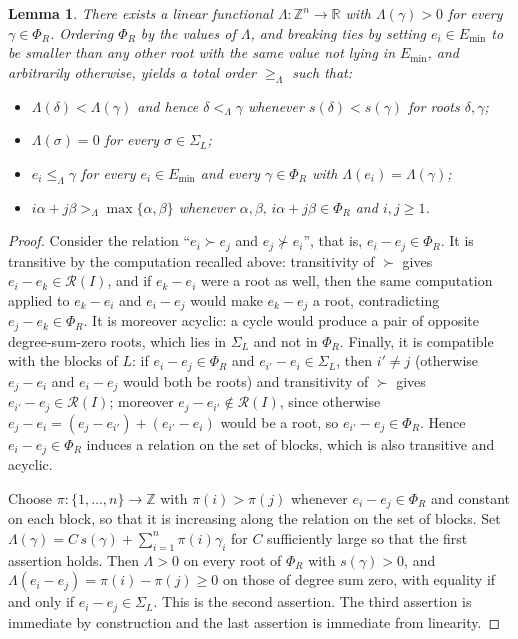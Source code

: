\documentclass[11pt,letterpaper,reqno]{amsart}
\newtheorem{lemma}[lemma]{Lemma}
\theoremstyle{remark}
\theoremstyle{definition}
\newcommand{\ZZ}[0]{\ensuremath{\mathbb{Z}}}
\newcommand{\RR}[0]{\ensuremath{\mathbb{R}}}
\newcommand{\R}{\mathcal R}
\begin{document}
\begin{lemma}\label{lem:order-PhiR}
There exists a linear functional $\Lambda\colon\ZZ^n\to\RR$ with
$\Lambda(\gamma)>0$ for every $\gamma\in\Phi_R$. Ordering $\Phi_R$ by the values
of $\Lambda$, and breaking ties by setting $e_i\in E_\mathrm{min}$ to be smaller than any other root with the same value not lying in $E_\mathrm{min}$, and arbitrarily otherwise, yields a total order $\geq_\Lambda$ such that:
\begin{itemize}
    \item $\Lambda(\delta)<\Lambda(\gamma)$ and hence $\delta<_\Lambda\gamma$ whenever $s(\delta)<s(\gamma)$ for roots $\delta,\gamma$;
    \item $\Lambda(\sigma)=0$ for every $\sigma\in\Sigma_L$;
    \item $e_i\leq_\Lambda \gamma$ for every $e_i\in E_\mathrm{min}$ and every $\gamma\in\Phi_R$ with $\Lambda(e_i)=\Lambda(\gamma)$;
    \item $i\alpha+j\beta>_\Lambda\max\{\alpha,\beta\}$ whenever $\alpha,\beta,\,i\alpha+j\beta\in\Phi_R$ and $i,j\geq1$.
\end{itemize}
\end{lemma}

\begin{proof}
Consider the relation ``$e_i\succ e_j$ and $e_j\not\succ e_i$'', that is, $e_i-e_j\in\Phi_R$. It is transitive by the computation recalled above: transitivity of
$\succ$ gives $e_i-e_k\in\R(I)$, and if $e_k-e_i$ were a root as well, then the same computation applied to $e_k-e_i$ and $e_i-e_j$ would make $e_k-e_j$ a root, contradicting $e_j-e_k\in\Phi_R$. It is moreover acyclic: a cycle would produce a pair of opposite degree-sum-zero roots, which lies in $\Sigma_L$ and not in $\Phi_R$. Finally, it is compatible with the blocks of $L$: if $e_i-e_j\in\Phi_R$ and $e_{i'}-e_i\in\Sigma_L$, then $i'\neq j$ (otherwise $e_j-e_i$ and $e_i-e_j$ would both be roots) and transitivity of $\succ$ gives $e_{i'}-e_j\in\R(I)$; moreover $e_j-e_{i'}\notin\R(I)$, since otherwise $e_j-e_i=(e_j-e_{i'})+(e_{i'}-e_i)$ would be a root, so $e_{i'}-e_j\in\Phi_R$. Hence $e_i-e_j\in\Phi_R$ induces a relation on the set of blocks, which is also transitive and acyclic.

Choose $\pi\colon\{1,\dots,n\}\to\ZZ$ with $\pi(i)>\pi(j)$ whenever $e_i-e_j\in\Phi_R$ and constant on each block, so that it is increasing along the relation on the set of blocks. Set $\Lambda(\gamma)=C\,s(\gamma)+\sum_{i=1}^n\pi(i)\gamma_i$ for $C$ sufficiently
large so that the first assertion holds. Then $\Lambda>0$ on every root of $\Phi_R$ with $s(\gamma)>0$, and $\Lambda(e_i-e_j)=\pi(i)-\pi(j)\geq 0$ on those of degree sum zero, with equality if and only if $e_i-e_j\in\Sigma_L$. This is the second assertion. The third assertion is immediate by construction and the last assertion is immediate from linearity.
\end{proof}
\end{document}
